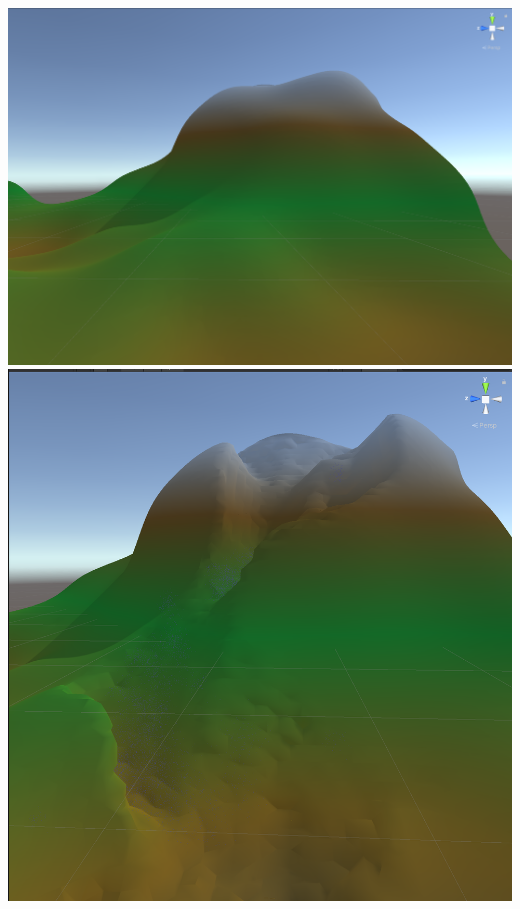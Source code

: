 \documentclass[acmtog]{acmart}
\begin{document}
\begin{center}
    \includegraphics[width=0.9\linewidth]{../Images/Erosion_Before.png}
    \includegraphics[width=0.9\linewidth]{../Images/Erosion_After.png}
\end{center}
\end{document}
